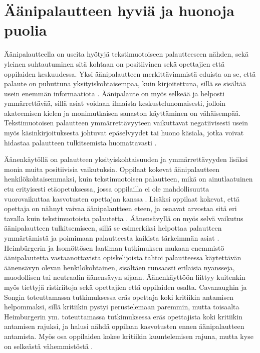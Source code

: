\documentclass[utf8]{gradu3}
\begin{document}
\section{Äänipalautteen hyviä ja huonoja puolia}

Äänipalautteella on useita hyötyjä tekstimuotoiseen palautteeseen nähden, sekä yleinen suhtautuminen sitä kohtaan on positiivinen sekä opettajien että oppilaiden keskuudessa. Yksi äänipalautteen merkittävimmistä eduista on se, että palaute on puhuttuna yksityiskohtaisempaa, kuin kirjoitettuna, sillä se sisältää usein enemmän informaatiota \parencite[][]{attitudes}. Äänipalaute on myös selkeää ja helposti ymmärrettävää, sillä asiat voidaan ilmaista keskustelunomaisesti, jolloin akateemisen kielen ja monimutkaisen sanaston käyttäminen on vähäisempää. Tekstimuotoisen palautteen ymmärrettävyyteen vaikuttavat negatiivisesti usein myös käsinkirjoituksesta johtuvat epäselvyydet tai huono käsiala, jotka voivat hidastaa palautteen tulkitsemista huomattavasti \parencite[][]{developing}.

Äänenkäytöllä on palautteen yksityiskohtaisuuden ja ymmärrettävyyden lisäksi monia muita positiivisia vaikutuksia. Oppilaat kokevat äänipalautteen henkilökohtaisemmaksi, kuin tekstimuotoisen palautteen, mikä on ainutlaatuinen etu erityisesti etäopetuksessa, jossa oppilailla ei ole mahdollisuutta vuorovaikuttaa kasvotusten opettajan kanssa \parencite[][]{using, distanceLearning}. Lisäksi oppilaat kokevat, että opettaja on nähnyt vaivaa äänipalautteen eteen, ja osaavat arvostaa sitä eri tavalla kuin tekstimuotoista palautetta \parencite[][]{listenOrToRead}. Äänensävyllä on myös selvä vaikutus äänipalautteen tulkitsemiseen, sillä se esimerkiksi helpottaa palautteen ymmärtämistä ja poimimaan palautteesta kaikista tärkeimmän asiat \parencite[][]{attitudes}. Heimbürgerin ja Isomöttösen \parencite[][]{moderating} laatiman tutkimuksen mukaan enemmistö äänipalautetta vastaanottavista opiskelijoista tahtoi palautteessa käytettävän äänensävyn olevan henkilökohtainen, sisältäen runsaasti erilaisia nyansseja, muodollisen tai neutraalin äänensävyn sijaan. Äänenkäyttöön liittyy kuitenkin myös tiettyjä ristiriitoja sekä opettajien että oppilaiden osalta. Cavanaughin ja Songin \parencite[][]{versus} toteuttamassa tutkimuksessa eräs opettaja koki kritiikin antamisen helpommaksi, sillä kritiikin pystyi perustelemaan paremmin, mutta toisaalta Heimburgerin ym. \parencite[][]{academics} toteuttamassa tutkimuksessa eräs opettajista koki kritiikin antamisen rajuksi, ja halusi nähdä oppilaan kasvotusten ennen äänipalautteen antamista. Myös osa oppilaiden kokee kritiikin kuuntelemisen rajuna, mutta kyse on selkeästä vähemmistöstä \parencite[][]{voice}. 
\end{document}
